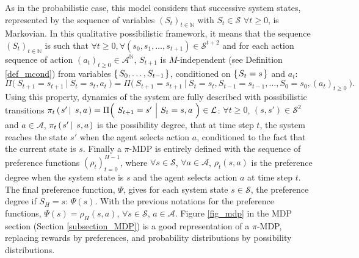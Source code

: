 As in the probabilistic case, this model considers that
successive system states, 
represented by the sequence of variables $(S_t)_{t \in \mathbb{N}}$
with $S_t \in \mathcal{S}$ $\forall t \geqslant 0$, is Markovian. 
In this qualitative possibilistic framework, 
it means that the sequence $(S_t)_{t \in \mathbb{N}}$ is such that
$\forall t \geqslant 0,  \forall (s_0,s_1,\ldots,s_{t+1}) \in \mathcal{S}^{t+2}$
and for each action sequence of action $(a_t)_{t\geqslant 0} \in \mathcal{A}^{\mathbb{N}}$, 
$S_{t+1}$ is $M$-independent (see Definition \ref{def_mcond}) from variables $\left\{ \left.  S_0, \ldots, S_{t-1}  \right. \right\}$,
conditioned on $\left\{ \left. S_t = s \right. \right\}$ and $a_t$: 
\begin{equation}
\label{equation_possmarkov}
  \Pi \Big( \ S_{t+1}=s_{t+1} \ \Big\vert \ S_t=s_t, a_t \ \Big) = \Pi \Big( \ S_{t+1}=s_{t+1} \ \Big\vert \ S_t=s_t, S_{t-1}=s_{t-1}, \ldots, S_0=s_0, (a_t)_{t \geqslant 0} \ \Big).
\end{equation}
Using this property, dynamics of the system are fully described 
with possibilistic transitions $\pi_t \paren{ s' \sachant s, a } = \Pi \Big( \ S_{t+1}=s' \ \Big\vert \ S_t=s, a \ \Big)  \in \mathcal{L}$:
$\forall t \geqslant 0$, $(s,s') \in \mathcal{S}^2$ and $a \in \mathcal{A}$,
$\pi_t \left( \left.  s' \, \right| \left. \, s, a  \right. \right)$ is the possibility degree, that at time step $t$, 
the system reaches the state $s'$ when the agent selects action $a$, 
conditioned to the fact that the current state is $s$.
Finally a $\pi$-MDP is entirely defined with the sequence of preference functions $(\rho_t)_{t=0}^{H-1}$,
where $\forall s \in \mathcal{S}$, $\forall a\in \mathcal{A}$, 
$\rho_t(s,a)$ is the preference degree when the system state is $s$ and the agent selects action $a$ at time step $t$.
The final preference function, $\Psi$, gives for each system state $s \in \mathcal{S}$, the preference degree
if $S_H = s$: $\Psi(s)$. With the previous notations for the preference functions,
$\Psi(s)=\rho_{H}(s,a)$, $\forall s \in \mathcal{S}$, $a \in \mathcal{A}$.
Figure \ref{fig_mdp} in the MDP section (Section \ref{subsection_MDP})
is a good representation of a $\pi$-MDP, replacing rewards by preferences,
and probability distributions by possibility distributions.

